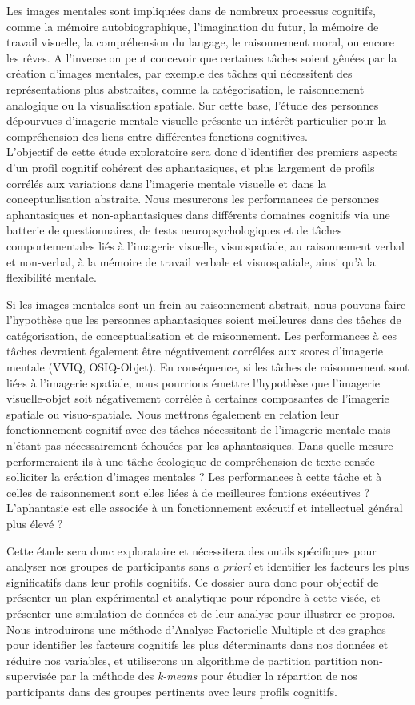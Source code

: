 \documentclass[
  12pt,
]{article}
\begin{document}
Les images mentales sont impliquées dans de nombreux processus
cognitifs, comme la mémoire autobiographique, l'imagination du futur, la
mémoire de travail visuelle, la compréhension du langage, le
raisonnement moral, ou encore les rêves. A l'inverse on peut concevoir
que certaines tâches soient gênées par la création d'images mentales,
par exemple des tâches qui nécessitent des représentations plus
abstraites, comme la catégorisation, le raisonnement analogique ou la
visualisation spatiale. Sur cette base, l'étude des personnes dépourvues
d'imagerie mentale visuelle présente un intérêt particulier pour la
compréhension des liens entre différentes fonctions cognitives.\\
L'objectif de cette étude exploratoire sera donc d'identifier des
premiers aspects d'un profil cognitif cohérent des aphantasiques, et
plus largement de profils corrélés aux variations dans l'imagerie
mentale visuelle et dans la conceptualisation abstraite. Nous mesurerons
les performances de personnes aphantasiques et non-aphantasiques dans
différents domaines cognitifs via une batterie de questionnaires, de
tests neuropsychologiques et de tâches comportementales liés à
l'imagerie visuelle, visuospatiale, au raisonnement verbal et
non-verbal, à la mémoire de travail verbale et visuospatiale, ainsi qu'à
la flexibilité mentale.

Si les images mentales sont un frein au raisonnement abstrait, nous
pouvons faire l'hypothèse que les personnes aphantasiques soient
meilleures dans des tâches de catégorisation, de conceptualisation et de
raisonnement. Les performances à ces tâches devraient également être
négativement corrélées aux scores d'imagerie mentale (VVIQ, OSIQ-Objet).
En conséquence, si les tâches de raisonnement sont liées à l'imagerie
spatiale, nous pourrions émettre l'hypothèse que l'imagerie
visuelle-objet soit négativement corrélée à certaines composantes de
l'imagerie spatiale ou visuo-spatiale. Nous mettrons également en
relation leur fonctionnement cognitif avec des tâches nécessitant de
l'imagerie mentale mais n'étant pas nécessairement échouées par les
aphantasiques. Dans quelle mesure performeraient-ils à une tâche
écologique de compréhension de texte censée solliciter la création
d'images mentales ? Les performances à cette tâche et à celles de
raisonnement sont elles liées à de meilleures fontions exécutives ?
L'aphantasie est elle associée à un fonctionnement exécutif et
intellectuel général plus élevé ?

Cette étude sera donc exploratoire et nécessitera des outils spécifiques
pour analyser nos groupes de participants sans \emph{a priori} et
identifier les facteurs les plus significatifs dans leur profils
cognitifs. Ce dossier aura donc pour objectif de présenter un plan
expérimental et analytique pour répondre à cette visée, et présenter une
simulation de données et de leur analyse pour illustrer ce propos. Nous
introduirons une méthode d'Analyse Factorielle Multiple et des graphes
pour identifier les facteurs cognitifs les plus déterminants dans nos
données et réduire nos variables, et utiliserons un algorithme de
partition partition non-supervisée par la méthode des \emph{k-means}
pour étudier la répartion de nos participants dans des groupes
pertinents avec leurs profils cognitifs.
\end{document}
